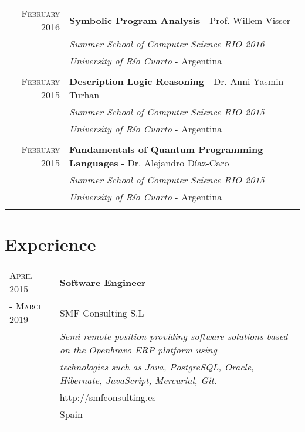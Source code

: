 \documentclass[a4paper,10pt]{article} %
\begin{document}
\begin{tabular}{rl}
\textsc{February} 2016 & \textbf{Symbolic Program Analysis} - Prof. Willem Visser \\
& \textit{Summer School of Computer Science RIO 2016} \\
& \textit{University of Río Cuarto} - Argentina \\ & \\

\textsc{February} 2015 & \textbf{Description Logic Reasoning} - Dr. Anni-Yasmin Turhan\\
& \textit{Summer School of Computer Science RIO 2015} \\
& \textit{University of Río Cuarto} - Argentina \\ & \\

\textsc{February} 2015 & \textbf{Fundamentals of Quantum Programming Languages} - Dr. Alejandro Díaz-Caro \\
& \textit{Summer School of Computer Science RIO 2015} \\
& \textit{University of Río Cuarto} - Argentina \\ & \\

\end{tabular}

\section{Experience}
\begin{tabular}{ll}
\textsc{April 2015} & \textbf{Software Engineer} \\
\textsc{- March 2019} & SMF Consulting S.L \\ 
& \textit{Semi remote position providing software solutions based on the Openbravo ERP platform using} \\ 
& \textit{technologies such as Java, PostgreSQL, Oracle, Hibernate, JavaScript, Mercurial, Git.} \\  
& http://smfconsulting.es \\
& Spain \\ & \\
\end{tabular}
\end{document}
